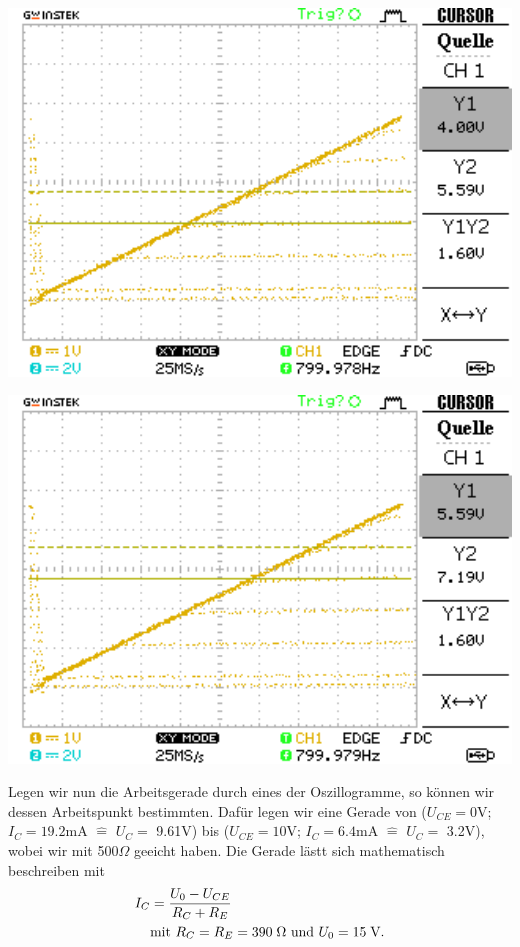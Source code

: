 \documentclass[10pt]{article}
\newenvironment{Figure}
  {\par\medskip\noindent\minipage{\linewidth}}
  {\endminipage\par\medskip}
\begin{document}
\begin{multicols}{2}
\begin{Figure}
		\label{fig:1.3}
	\end{Figure}
	\begin{Figure}
		\centering\includegraphics[width=1\textwidth]{data/Kennlinie3_npn.png}
		\label{fig:1.4}
	\end{Figure}
	\begin{Figure}
		\centering\includegraphics[width=1\textwidth]{data/Kennlinie4_npn.png}
		\label{fig:1.5}
	\end{Figure}

  Legen wir nun die Arbeitsgerade durch eines der Oszillogramme, so können wir dessen Arbeitspunkt bestimmten. Dafür legen wir eine Gerade von ($U_{CE} = 0$\;V; $I_C = 19.2$\;mA $\hat{=}$ $U_C=$ 9.61\;V) bis ($U_{CE} = 10$\;V; $I_C = 6.4$\;mA $\hat{=}$ $U_C=$ 3.2\;V), wobei wir mit 500\;$\Omega$ geeicht haben. Die Gerade lästt sich mathematisch beschreiben mit
  \begin{align*}
    I_C &= \frac{U_0 - U_{CE}}{R_C + R_E} \\
        & \text{mit } R_C=R_E=390\text{\;}\Omega \text{ und } U_0 = 15\text{\;V.}
  \end{align*}


\end{multicols}
\end{document}
